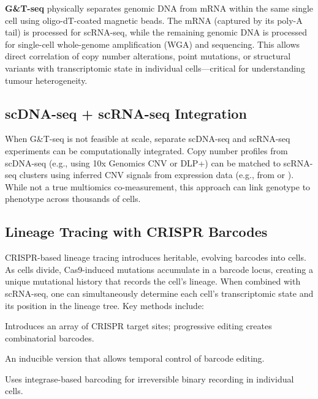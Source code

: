 \textbf{G\&T-seq} physically separates genomic DNA from mRNA within the same single cell using oligo-dT-coated magnetic beads. The mRNA (captured by its poly-A tail) is processed for scRNA-seq, while the remaining genomic DNA is processed for single-cell whole-genome amplification (WGA) and sequencing. This allows direct correlation of copy number alterations, point mutations, or structural variants with transcriptomic state in individual cells---critical for understanding tumour heterogeneity.

\subsection{scDNA-seq + scRNA-seq Integration}
\label{subsec:multiomics:scdna-scrna}

When G\&T-seq is not feasible at scale, separate scDNA-seq and scRNA-seq experiments can be computationally integrated. Copy number profiles from scDNA-seq (e.g., using 10x Genomics CNV or DLP+) can be matched to scRNA-seq clusters using inferred CNV signals from expression data (e.g., from  or ). While not a true multiomics co-measurement, this approach can link genotype to phenotype across thousands of cells.

\subsection{Lineage Tracing with CRISPR Barcodes}
\label{subsec:multiomics:crispr-lineage}

CRISPR-based lineage tracing introduces heritable, evolving barcodes into cells. As cells divide, Cas9-induced mutations accumulate in a barcode locus, creating a unique mutational history that records the cell's lineage. When combined with scRNA-seq, one can simultaneously determine each cell's transcriptomic state and its position in the lineage tree. Key methods include:

\begin{description}[style=nextline, itemsep=3pt]
  \item[GESTALT (Genome Editing of Synthetic Target Arrays for Lineage Tracing)] Introduces an array of CRISPR target sites; progressive editing creates combinatorial barcodes.
  \item[CARLIN (CRISPR Array Repair Lineage tracing)] An inducible version that allows temporal control of barcode editing.
  \item[intMEMOIR] Uses integrase-based barcoding for irreversible binary recording in individual cells.
\end{description}


